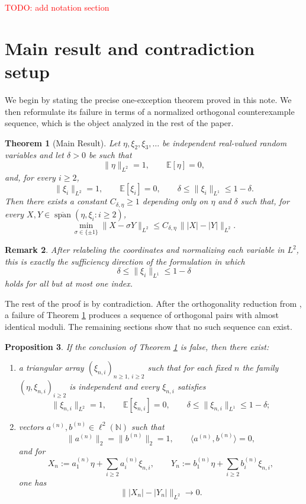 \documentclass[11pt]{amsart}
\newtheorem{theorem}{Theorem}
\newtheorem{proposition}[theorem]{Proposition}
\newtheorem{remark}[theorem]{Remark}
\newcommand{\E}{\mathbb E}
\newcommand{\N}{\mathbb N}
\newcommand{\Span}{\operatorname{span}}
\begin{document}
\textcolor{red}{TODO: add notation section}
\section{Main result and contradiction setup}

We begin by stating the precise one-exception theorem proved in this note. We
then reformulate its failure in terms of a normalized orthogonal
counterexample sequence, which is the object analyzed in the rest of the
paper.

\begin{theorem}[Main Result]
\label{thm:main}
Let $\eta,\xi_2,\xi_3,\dots$ be independent real-valued random variables and
let $\delta > 0$ be such that
\[
\|\eta\|_{L^2} = 1,
\qquad
\E[\eta] = 0,
\]
and, for every $i \ge 2$,
\[
\|\xi_i\|_{L^2} = 1,
\qquad
\E[\xi_i] = 0,
\qquad
\delta \le \|\xi_i\|_{L^1} \le 1-\delta.
\]
Then there exists a constant $C_{\delta,\eta} \ge 1$ depending only on $\eta$ and $\delta$ such that, for every
$X,Y \in \overline{\Span}(\eta,\xi_i : i \ge 2)$,
\[
\min_{\sigma \in \{\pm 1\}} \|X-\sigma Y\|_{L^2}
\le
C_{\delta,\eta} \, \bigl\| |X|-|Y| \bigr\|_{L^2}.
\]
\end{theorem}

\begin{remark}
After relabeling the coordinates and normalizing each variable in $L^2$, this
is exactly the sufficiency direction of the formulation in which
\[
\delta \le \|\xi_i\|_{L^1} \le 1-\delta
\]
holds for all but at most one index.
\end{remark}

The rest of the proof is by contradiction. After the orthogonality
reduction from \cite{FOTP}, a failure of Theorem \ref{thm:main} produces a sequence of
orthogonal pairs with almost identical moduli. The remaining sections show
that no such sequence can exist.

\begin{proposition}
\label{prop:counterexample-array}
If the conclusion of Theorem \ref{thm:main} is false, then there exist:
\begin{enumerate}[label=\rm(\roman*)]
\item a triangular array $(\xi_{n,i})_{n \ge 1,\ i \ge 2}$ such that for each
fixed $n$ the family $(\eta,\xi_{n,i})_{i \ge 2}$ is independent and every
$\xi_{n,i}$ satisfies
\[
\|\xi_{n,i}\|_{L^2} = 1,
\qquad
\E[\xi_{n,i}] = 0,
\qquad
\delta \le \|\xi_{n,i}\|_{L^1} \le 1-\delta;
\]
\item vectors $a^{(n)}, b^{(n)} \in \ell^2(\N)$ such that
\[
\|a^{(n)}\|_2 = \|b^{(n)}\|_2 = 1,
\qquad
\langle a^{(n)}, b^{(n)} \rangle = 0,
\]
and for 
\[
X_n := a_1^{(n)}\eta + \sum_{i \ge 2} a_i^{(n)} \xi_{n,i},
\qquad
Y_n := b_1^{(n)}\eta + \sum_{i \ge 2} b_i^{(n)} \xi_{n,i},
\]
one has
\[
\bigl\| |X_n|-|Y_n| \bigr\|_{L^2} \longrightarrow 0.
\]
\end{enumerate}
\end{proposition}
\end{document}

